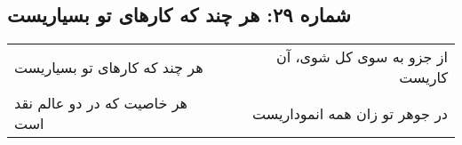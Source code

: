 \begin{center}
\section*{شماره ۲۹: هر چند که کارهای تو بسیاریست}
\label{sec:029}
\begin{longtable}{l p{0.5cm} r}
هر چند که کارهای تو بسیاریست
&&
از جزو به سوی کل شوی، آن کاریست
\\
هر خاصیت که در دو عالم نقد است
&&
در جوهر تو زان همه انموداریست
\\
\end{longtable}
\end{center}
